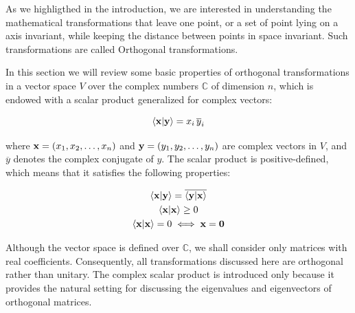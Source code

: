 \documentclass[12pt]{article}
\begin{document}
As we highligthed in the introduction, we are interested in understanding the mathematical
transformations that leave one point, or a set of point lying on a axis invariant, while
keeping the distance between points in space invariant. Such transformations are
called Orthogonal transformations. \par

In this section we will review some basic properties of orthogonal transformations in a
vector space $V$ over the complex numbers $\mathbb{C}$ of dimension $n$, which is endowed with
a scalar product generalized for complex vectors:

\[
  \ip{\vb{x}}{\vb{y}} = x_i\,\overline{y}_i
\]

where $\vb{x} = (x_1, x_2, \ldots, x_n)$ and $\vb{y} = (y_1, y_2, \ldots, y_n)$ are complex
vectors in $V$, and $\overline{y}$ denotes the complex conjugate of $y$. The scalar product
is positive-defined, which means that it satisfies the following properties:

\[
  \begin{gathered}
    \ip{\vb{x}}{\vb{y}} = \overline{\ip{\vb{y}}{\vb{x}}} \\
    \ip{\vb{x}}{\vb{x}} \geq 0 \\
    \ip{\vb{x}}{\vb{x}} = 0 \iff \vb{x} = \vb{0}
  \end{gathered}
\]

Although the vector space is defined over $\mathbb{C}$, we shall consider only matrices with real coefficients.
Consequently, all transformations discussed here are orthogonal rather than unitary.
The complex scalar product is introduced only because it provides the natural setting
for discussing the eigenvalues and eigenvectors of orthogonal matrices.
\end{document}
